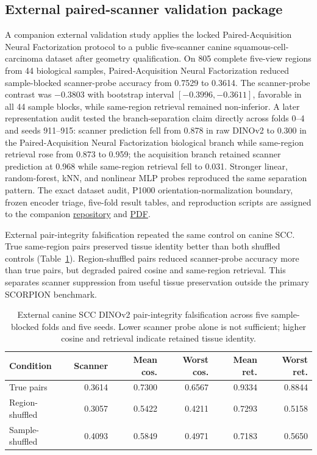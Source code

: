 \documentclass[10pt]{article}
\begin{document}
\subsection{External paired-scanner validation package}
A companion external validation study applies the locked Paired-Acquisition Neural Factorization protocol to a public five-scanner canine squamous-cell-carcinoma dataset after geometry qualification. On 805 complete five-view regions from 44 biological samples, Paired-Acquisition Neural Factorization reduced sample-blocked scanner-probe accuracy from 0.7529 to 0.3614. The scanner-probe contrast was $-0.3803$ with bootstrap interval $[-0.3996,-0.3611]$, favorable in all 44 sample blocks, while same-region retrieval remained non-inferior. A later representation audit tested the branch-separation claim directly across folds 0--4 and seeds 911--915: scanner prediction fell from 0.878 in raw DINOv2 to 0.300 in the Paired-Acquisition Neural Factorization biological branch while same-region retrieval rose from 0.873 to 0.959; the acquisition branch retained scanner prediction at 0.968 while same-region retrieval fell to 0.031. Stronger linear, random-forest, kNN, and nonlinear MLP probes reproduced the same separation pattern. The exact dataset audit, P1000 orientation-normalization boundary, frozen encoder triage, five-fold result tables, and reproduction scripts are assigned to the companion \href{https://github.com/matthewvaishnav/paired-acquisition-factorization-caninescc}{repository} and \href{https://matthewvaishnav.github.io/paired-acquisition-factorization-caninescc/paired-acquisition-factorization-caninescc.pdf}{PDF}.

External pair-integrity falsification repeated the same control on canine SCC. True same-region pairs preserved tissue identity better than both shuffled controls (Table~\ref{tab:canine_pair_integrity}). Region-shuffled pairs reduced scanner-probe accuracy more than true pairs, but degraded paired cosine and same-region retrieval. This separates scanner suppression from useful tissue preservation outside the primary SCORPION benchmark.

\begin{table}[t]
\centering
\caption{External canine SCC DINOv2 pair-integrity falsification across five sample-blocked folds and five seeds. Lower scanner probe alone is not sufficient; higher cosine and retrieval indicate retained tissue identity.}
\scriptsize
\setlength{\tabcolsep}{2.0pt}
\begin{tabular}{@{}lrrrrr@{}}
\toprule
Condition & Scanner & Mean cos. & Worst cos. & Mean ret. & Worst ret. \\
\midrule
True pairs & 0.3614 & 0.7300 & 0.6567 & 0.9334 & 0.8844 \\
Region-shuffled & 0.3057 & 0.5422 & 0.4211 & 0.7293 & 0.5158 \\
Sample-shuffled & 0.4093 & 0.5849 & 0.4971 & 0.7183 & 0.5650 \\
\bottomrule
\end{tabular}
\label{tab:canine_pair_integrity}
\end{table}
\end{document}
